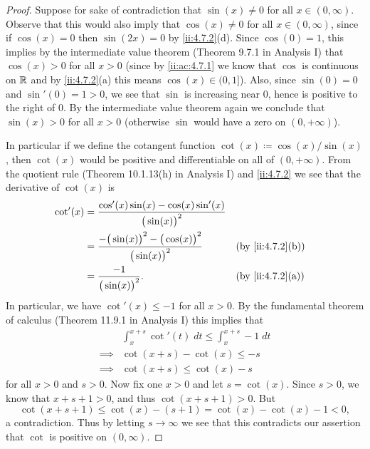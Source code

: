 \begin{proof}
  Suppose for sake of contradiction that \(\sin(x) \neq 0\) for all \(x \in (0, \infty)\).
  Observe that this would also imply that \(\cos(x) \neq 0\) for all \(x \in (0, \infty)\), since if \(\cos(x) = 0\) then \(\sin(2x) = 0\) by \cref{ii:4.7.2}(d).
  Since \(\cos(0) = 1\), this implies by the intermediate value theorem (Theorem 9.7.1 in Analysis I) that \(\cos(x) > 0\) for all \(x > 0\)
  (since by \cref{ii:ac:4.7.1} we know that \(\cos\) is continuous on \(\mathbb{R}\) and by \cref{ii:4.7.2}(a) this means \(\cos(x) \in (0, 1]\)).
  Also, since \(\sin(0) = 0\) and \(\sin'(0) = 1 > 0\), we see that \(\sin\) is increasing near \(0\), hence is positive to the right of \(0\).
  By the intermediate value theorem again we conclude that \(\sin(x) > 0\) for all \(x > 0\)
  (otherwise \(\sin\) would have a zero on \((0, +\infty)\)).

  In particular if we define the cotangent function \(\cot(x) \coloneqq \cos(x) / \sin(x)\), then \(\cot(x)\) would be positive and differentiable on all of \((0, +\infty)\).
  From the quotient rule (Theorem 10.1.13(h) in Analysis I) and \cref{ii:4.7.2} we see that the derivative of \(\cot(x)\) is
  \begin{align*}
    \cot'(x) & = \dfrac{\cos'(x) \sin(x) - \cos(x) \sin'(x)}{\big(\sin(x)\big)^2}                              \\
             & = \dfrac{-\big(\sin(x)\big)^2 - \big(\cos(x)\big)^2}{\big(\sin(x)\big)^2} &  & \by{ii:4.7.2}[b] \\
             & = \dfrac{-1}{\big(\sin(x)\big)^2}.                                        &  & \by{ii:4.7.2}[a]
  \end{align*}
  In particular, we have \(\cot'(x) \leq -1\) for all \(x > 0\).
  By the fundamental theorem of calculus (Theorem 11.9.1 in Analysis I) this implies that
  \begin{align*}
             & \int_x^{x + s} \cot'(t) \; dt \leq \int_x^{x + s} -1 \; dt \\
    \implies & \cot(x + s) - \cot(x) \leq -s                              \\
    \implies & \cot(x + s) \leq \cot(x) - s
  \end{align*}
  for all \(x > 0\) and \(s > 0\).
  Now fix one \(x > 0\) and let \(s = \cot(x)\).
  Since \(s > 0\), we know that \(x + s + 1 > 0\), and thus \(\cot(x + s + 1) > 0\).
  But
  \[
    \cot(x + s + 1) \leq \cot(x) - (s + 1) = \cot(x) - \cot(x) - 1 < 0,
  \]
  a contradiction.
  Thus by letting \(s \to \infty\) we see that this contradicts our assertion that \(\cot\) is positive on \((0, \infty)\).
\end{proof}

